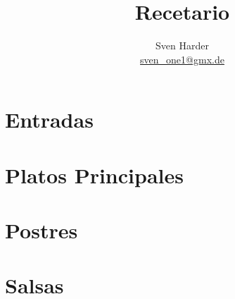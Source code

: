 \documentclass[%
a4paper,
11pt
]{article}
\begin{document}
\title{Recetario}
\author{Sven Harder\\ \href{mailto:sven\_one1@gmx.de}{sven\_one1@gmx.de}}


\tableofcontents

\vspace{5em}

\section{Entradas}



\section{Platos Principales}


%











\section{Postres}




\section{Salsas}





\end{document}
